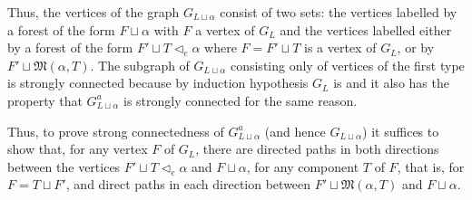 \documentclass[12pt]{amsart}
\numberwithin{equation}{section}
\def\fM{{\mathfrak M}}
\begin{document}
\smallskip

Thus, the vertices of the graph $G_{L \sqcup \alpha}$ consist of two sets: the vertices labelled by
a forest of the form $F \sqcup \alpha$ with $F$ a vertex of $G_L$ and the vertices labelled either by
a forest of the form $F'\sqcup T \lhd_e \alpha$ where $F=F'\sqcup T$ is a vertex of $G_L$, or by $F'\sqcup \fM(\alpha, T)$.
The subgraph of $G_{L \sqcup \alpha}$ consisting only of vertices of the first type is strongly
connected because by induction hypothesis $G_L$ is and it also has the property that
$G^a_{L \sqcup \alpha}$ is strongly connected for the same reason. 

\smallskip

Thus, to prove strong connectedness of $G^a_{L \sqcup \alpha}$ (and hence $G_{L \sqcup \alpha}$)
it suffices to show that, for any vertex $F$ of $G_L$, there are directed paths in both directions between
the vertices $F'\sqcup T \lhd_e \alpha$ and $F \sqcup \alpha$, for any component $T$ of $F$,
that is, for $F=T\sqcup F'$, and direct paths in each direction between $F'\sqcup \fM(\alpha, T)$ and $F \sqcup \alpha$.

\smallskip
\end{document}
